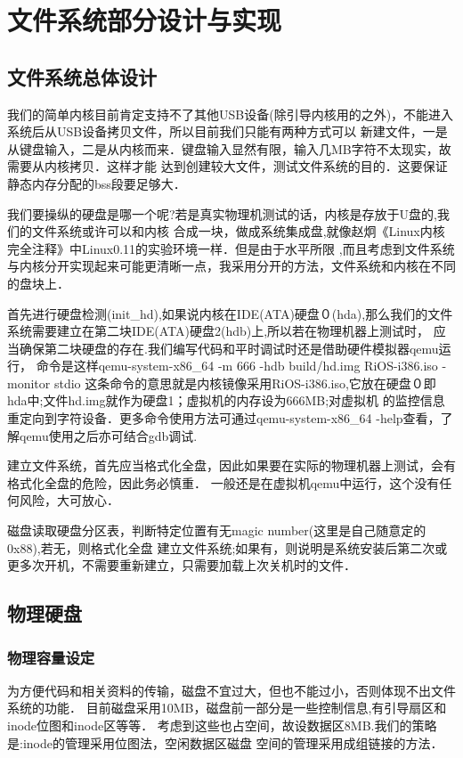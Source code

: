 \chapter{文件系统部分设计与实现} 
\section{文件系统总体设计}
我们的简单内核目前肯定支持不了其他USB设备(除引导内核用的之外)，不能进入系统后从USB设备拷贝文件，所以目前我们只能有两种方式可以
新建文件，一是从键盘输入，二是从内核而来．键盘输入显然有限，输入几MB字符不太现实，故需要从内核拷贝．这样才能
达到创建较大文件，测试文件系统的目的．这要保证静态内存分配的bss段要足够大．


我们要操纵的硬盘是哪一个呢?若是真实物理机测试的话，内核是存放于U盘的,我们的文件系统或许可以和内核
合成一块，做成系统集成盘,就像赵炯《Linux内核完全注释》中Linux0.11的实验环境一样．但是由于水平所限
,而且考虑到文件系统与内核分开实现起来可能更清晰一点，我采用分开的方法，文件系统和内核在不同的盘块上．

首先进行硬盘检测(init\_hd),如果说内核在IDE(ATA)硬盘０(hda),那么我们的文件系统需要建立在第二块IDE(ATA)硬盘2(hdb)上,所以若在物理机器上测试时，
应当确保第二块硬盘的存在.我们编写代码和平时调试时还是借助硬件模拟器qemu运行，
命令是这样qemu-system-x86\_64 -m 666 -hdb build/hd.img RiOS-i386.iso -monitor stdio
这条命令的意思就是内核镜像采用RiOS-i386.iso,它放在硬盘０即hda中;文件hd.img就作为硬盘1；虚拟机的内存设为666MB;对虚拟机
的监控信息重定向到字符设备．更多命令使用方法可通过qemu-system-x86\_64 -help查看，了解qemu使用之后亦可结合gdb调试.

建立文件系统，首先应当格式化全盘，因此如果要在实际的物理机器上测试，会有格式化全盘的危险，因此务必慎重．
一般还是在虚拟机qemu中运行，这个没有任何风险，大可放心．

磁盘读取硬盘分区表，判断特定位置有无magic number(这里是自己随意定的0x88),若无，则格式化全盘
建立文件系统;如果有，则说明是系统安装后第二次或更多次开机，不需要重新建立，只需要加载上次关机时的文件．

\section{物理硬盘}
\subsection{物理容量设定}

为方便代码和相关资料的传输，磁盘不宜过大，但也不能过小，否则体现不出文件系统的功能．
目前磁盘采用10MB，磁盘前一部分是一些控制信息,有引导扇区和inode位图和inode区等等．
考虑到这些也占空间，故设数据区8MB.我们的策略是:inode的管理采用位图法，空闲数据区磁盘
空间的管理采用成组链接的方法．

